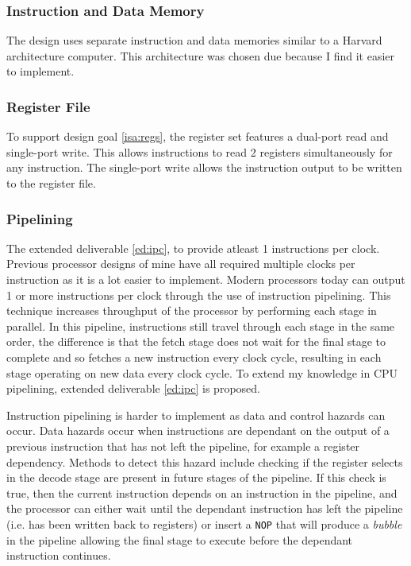\subsubsection{Instruction and Data Memory}
The design uses separate instruction and data memories similar to a Harvard architecture computer. This architecture was chosen due because I find it easier to implement.

\subsubsection{Register File}
To support design goal \ref{isa:regs}, the register set features a dual-port read and single-port write. This allows instructions to read 2 registers simultaneously for any instruction. The single-port write allows the instruction output to be written to the register file. 

\subsubsection{Pipelining}
The extended deliverable \ref{ed:ipc}, to provide atleast 1 instructions per clock. Previous processor designs of mine have all required multiple clocks per instruction as it is a lot easier to implement. Modern processors today can output 1 or more instructions per clock through the use of instruction pipelining. This technique increases throughput of the processor by performing each stage in parallel. In this pipeline, instructions still travel through each stage in the same order, the difference is that the  fetch stage does not wait for the final stage to complete and so fetches a new instruction every clock cycle, resulting in each stage operating on new data every clock cycle. To extend my knowledge in CPU pipelining, extended deliverable \ref{ed:ipc} is proposed.

Instruction pipelining is harder to implement as data and control hazards can occur. Data hazards occur when instructions  are dependant on the output of a previous instruction that has not left the pipeline, for example a register dependency. Methods to detect this hazard include checking if the register selects in the decode stage are present in future stages of the pipeline. If this check is true, then the current instruction depends on an instruction in the pipeline, and the processor can  either wait until the dependant instruction has left the pipeline (i.e. has been written back to registers) or insert a \verb|NOP| that will produce a \textit{bubble} in the pipeline allowing the final stage to execute before the dependant instruction continues.

